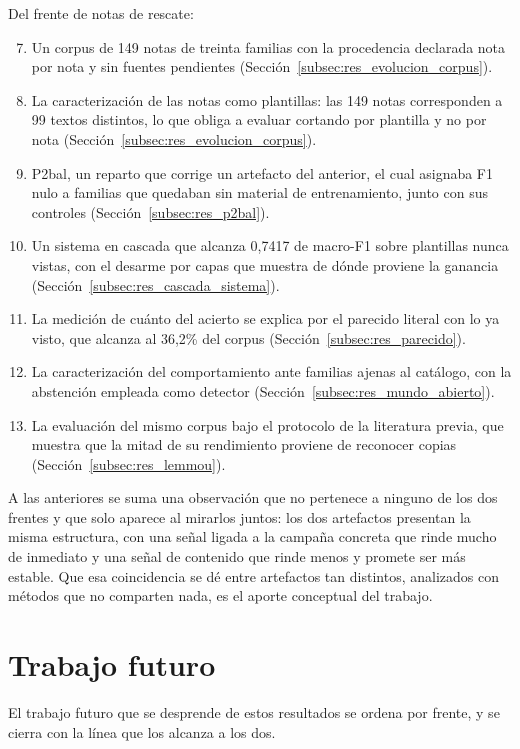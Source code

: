 Del frente de notas de rescate:

\begin{enumerate}
\setcounter{enumi}{6}
\item Un corpus de 149 notas de treinta familias con la procedencia declarada nota por nota y sin fuentes pendientes (Sección~\ref{subsec:res_evolucion_corpus}).
\item La caracterización de las notas como plantillas: las 149 notas corresponden a 99 textos distintos, lo que obliga a evaluar cortando por plantilla y no por nota (Sección~\ref{subsec:res_evolucion_corpus}).
\item P2bal, un reparto que corrige un artefacto del anterior, el cual asignaba F1 nulo a familias que quedaban sin material de entrenamiento, junto con sus controles (Sección~\ref{subsec:res_p2bal}).
\item Un sistema en cascada que alcanza 0,7417 de macro-F1 sobre plantillas nunca vistas, con el desarme por capas que muestra de dónde proviene la ganancia (Sección~\ref{subsec:res_cascada_sistema}).
\item La medición de cuánto del acierto se explica por el parecido literal con lo ya visto, que alcanza al 36,2\% del corpus (Sección~\ref{subsec:res_parecido}).
\item La caracterización del comportamiento ante familias ajenas al catálogo, con la abstención empleada como detector (Sección~\ref{subsec:res_mundo_abierto}).
\item La evaluación del mismo corpus bajo el protocolo de la literatura previa, que muestra que la mitad de su rendimiento proviene de reconocer copias (Sección~\ref{subsec:res_lemmou}).
\end{enumerate}

A las anteriores se suma una observación que no pertenece a ninguno de los dos frentes y que solo aparece al mirarlos juntos: los dos artefactos presentan la misma estructura, con una señal ligada a la campaña concreta que rinde mucho de inmediato y una señal de contenido que rinde menos y promete ser más estable. Que esa coincidencia se dé entre artefactos tan distintos, analizados con métodos que no comparten nada, es el aporte conceptual del trabajo.

\section{Trabajo futuro}
\label{sec:trabajo_futuro}

El trabajo futuro que se desprende de estos resultados se ordena por frente, y se cierra con la línea que los alcanza a los dos.


